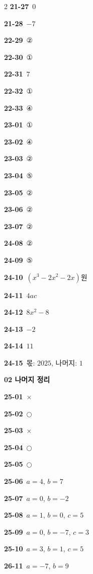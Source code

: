 \documentclass[10pt,a4paper]{article}
\begin{document}
\begin{multicols}{2}
\noindent\textbf{21-27}\ $0$\par
\noindent\textbf{21-28}\ $-7$\par
\noindent\textbf{22-29}\ ②\par
\noindent\textbf{22-30}\ ①\par
\noindent\textbf{22-31}\ $7$\par
\noindent\textbf{22-32}\ ①\par
\noindent\textbf{22-33}\ ④\par
\noindent\textbf{23-01}\ ①\par
\noindent\textbf{23-02}\ ④\par
\noindent\textbf{23-03}\ ②\par
\noindent\textbf{23-04}\ ⑤\par
\noindent\textbf{23-05}\ ②\par
\noindent\textbf{23-06}\ ②\par
\noindent\textbf{23-07}\ ②\par
\noindent\textbf{24-08}\ ②\par
\noindent\textbf{24-09}\ ⑤\par
\noindent\textbf{24-10}\ $(x^3-2x^2-2x)$원\par
\noindent\textbf{24-11}\ $4ac$\par
\noindent\textbf{24-12}\ $8x^2-8$\par
\noindent\textbf{24-13}\ $-2$\par
\noindent\textbf{24-14}\ $11$\par
\noindent\textbf{24-15}\ 몫: $2025$, 나머지: $1$\par
\noindent\textbf{02 나머지 정리}\par\smallskip
\noindent\textbf{25-01}\ $\times$\par
\noindent\textbf{25-02}\ $\bigcirc$\par
\noindent\textbf{25-03}\ $\times$\par
\noindent\textbf{25-04}\ $\bigcirc$\par
\noindent\textbf{25-05}\ $\bigcirc$\par
\noindent\textbf{25-06}\ $a=4$, $b=7$\par
\noindent\textbf{25-07}\ $a=0$, $b=-2$\par
\noindent\textbf{25-08}\ $a=1$, $b=0$, $c=5$\par
\noindent\textbf{25-09}\ $a=0$, $b=-7$, $c=3$\par
\noindent\textbf{25-10}\ $a=3$, $b=1$, $c=5$\par
\noindent\textbf{26-11}\ $a=-7$, $b=9$\par

\end{multicols}
\end{document}
